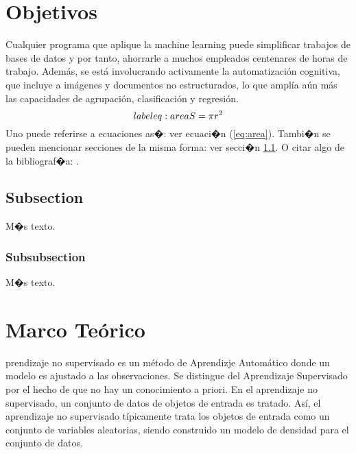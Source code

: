 \documentclass{article}
\theoremstyle{definition}
\theoremstyle{remark}
\begin{document}
\section{Objetivos}

Cualquier programa que aplique la machine learning puede simplificar trabajos de bases de datos y por tanto, ahorrarle a muchos empleados centenares de horas de trabajo. Además, se está involucrando activamente la automatización cognitiva, que incluye a imágenes y documentos no estructurados, lo que amplía aún más las capacidades de agrupación, clasificación y regresión.
\begin{equation}\\label{eq:area}
  S = \pi r^2
\end{equation}
Uno puede referirse a ecuaciones as�: ver ecuaci�n (\ref{eq:area}).
Tambi�n se pueden mencionar secciones de la misma forma: ver secci�n
\ref{sec:nada}. O citar algo de la bibliograf�a: \cite{Cd94}.

\subsection{Subsection}\label{sec:nada}

M�s texto.

\subsubsection{Subsubsection}\label{sec:nada2}

M�s texto.





\section{Marco Te\'orico}

prendizaje no supervisado es un método de Aprendizje Automático donde un modelo es ajustado a las observaciones. Se distingue del Aprendizaje Supervisado por el hecho de que no hay un conocimiento a priori. En el aprendizaje no supervisado, un conjunto de datos de objetos de entrada es tratado. Así, el aprendizaje no supervisado típicamente trata los objetos de entrada como un conjunto de variables aleatorias, siendo construido un modelo de densidad para el conjunto de datos. \\
\end{document}
